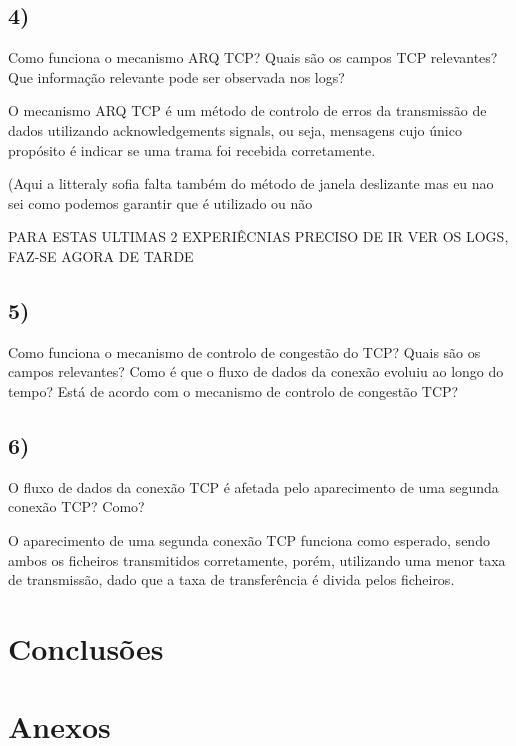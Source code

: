 \documentclass[11pt]{article}
\begin{document}
\subsection{4)} Como funciona o mecanismo ARQ TCP? Quais são os campos TCP relevantes? Que informação relevante pode ser observada nos logs?

O mecanismo ARQ TCP é um método de controlo de erros da transmissão de dados utilizando acknowledgements signals, ou seja, mensagens cujo único propósito é indicar se uma trama foi recebida corretamente.

(Aqui a litteraly sofia falta também do método de janela deslizante mas eu nao sei como podemos garantir que é utilizado ou não

PARA ESTAS ULTIMAS 2 EXPERIÊCNIAS PRECISO DE IR VER OS LOGS, FAZ-SE AGORA DE TARDE

\subsection{5)} Como funciona o mecanismo de controlo de congestão do TCP? Quais são os campos relevantes? Como é que o fluxo de dados da conexão evoluiu ao longo do tempo? Está de acordo com o mecanismo de controlo de congestão TCP?



\subsection{6)} O fluxo de dados da conexão TCP é afetada pelo aparecimento de uma segunda conexão TCP? Como?

O aparecimento de uma segunda conexão TCP funciona como esperado, sendo ambos os ficheiros transmitidos corretamente, porém, utilizando uma menor taxa de transmissão, dado que a taxa de transferência é divida pelos ficheiros.


\section{Conclusões}

\section{Anexos}
\end{document}
